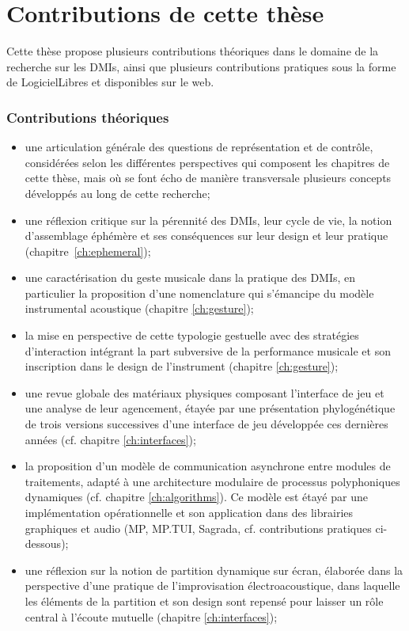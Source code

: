 \section{Contributions de cette thèse}

\noindent Cette thèse propose plusieurs contributions théoriques dans le domaine de la recherche sur les \glspl{DMI}, ainsi que plusieurs contributions pratiques sous la forme de \glspl{LogicielLibre} et disponibles sur le web.

\subsubsection*{Contributions théoriques}

\begin{itemize}[noitemsep]
\item une articulation générale des questions de représentation et de contrôle, considérées selon les différentes perspectives qui composent les chapitres de cette thèse, mais où se font écho de manière transversale plusieurs concepts développés au long de cette recherche;
\item une réflexion critique sur la pérennité des \glspl{DMI}, leur cycle de vie, la notion d'assemblage éphémère et ses conséquences sur leur design et leur pratique (chapitre~\ref{ch:ephemeral});
\item une caractérisation du geste musicale dans la pratique des \glspl{DMI}, en particulier la proposition d'une nomenclature qui s'émancipe du modèle instrumental acoustique (chapitre \ref{ch:gesture});
\item la mise en perspective de cette typologie gestuelle avec des stratégies d'interaction intégrant la part subversive de la performance musicale et son inscription dans le design de l'instrument (chapitre \ref{ch:gesture});
\item une revue globale des matériaux physiques composant l'interface de jeu et une analyse de leur agencement, étayée par une présentation phylogénétique de trois versions successives d'une interface de jeu développée ces dernières années (cf. chapitre \ref{ch:interfaces});
\item la proposition d'un modèle de communication asynchrone entre modules de traitements, adapté à une architecture modulaire de processus polyphoniques dynamiques (cf. chapitre \ref{ch:algorithms}). Ce modèle est étayé par une implémentation opérationnelle et son application dans des librairies graphiques et audio  (MP, MP.TUI, Sagrada, cf. contributions pratiques ci-dessous);
\item une réflexion sur la notion de partition dynamique sur écran, élaborée dans la perspective d'une pratique de l'improvisation électroacoustique, dans laquelle les éléments de la partition et son design sont repensé pour laisser un rôle central à l'écoute mutuelle (chapitre \ref{ch:interfaces});
\end{itemize}

